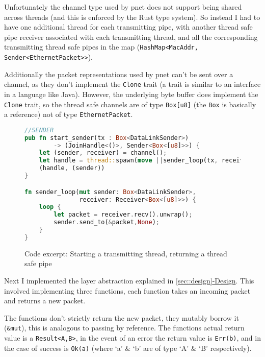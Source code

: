 \documentclass[12pt,a4paper,twoside,openright]{report}
\begin{document}
Unfortunately the channel type used by pnet does not support being shared across threads (and this is enforced by the Rust type system).  So instead I had to have one additional thread for each transmitting pipe, with another thread safe pipe receiver associated with each transmitting thread, and all the corresponding transmitting thread safe pipes in the map (\verb!HashMap<MacAddr, Sender<EthernetPacket>>!).

Additionally the packet representations used by pnet can't be sent over a channel, as they don't implement the \verb!Clone! trait (a trait is similar to an interface in a language like Java).  However, the underlying byte buffer does implement the \verb!Clone! trait, so the thread safe channels are of type \verb!Box[u8]! (the \verb!Box! is basically a reference) not of type \verb!EthernetPacket!. 

\begin{figure}
\centering
\begin{varwidth}{\linewidth}
\begin{lstlisting}[language=Rust]
//SENDER
pub fn start_sender(tx : Box<DataLinkSender>) 
 		-> (JoinHandle<()>, Sender<Box<[u8]>>) {
    let (sender, receiver) = channel();
    let handle = thread::spawn(move ||sender_loop(tx, receiver));
    (handle, (sender))
}

fn sender_loop(mut sender: Box<DataLinkSender>, 
			   receiver: Receiver<Box<[u8]>>) {
    loop {
        let packet = receiver.recv().unwrap();
        sender.send_to(&packet,None);
    }
}
\end{lstlisting}
\end{varwidth}
\caption{Code excerpt: Starting a transmitting thread, returning a thread safe pipe}
\label{fig::sending}
\end{figure}

\bigskip

Next I implemented the layer abstraction explained in \ref{sec::design}\hyperref[sec::design]{-Design}.  This involved implementing three functions, each function takes an incoming packet and returns a new packet.  

The functions don't strictly return the new packet, they mutably borrow it (\verb!&mut!), this is analogous to passing by reference. The functions actual return value is a \verb!Result<A,B>!, in the event of an error the return value is \verb!Err(b)!, and in the case of success is \verb!Ok(a)! (where `a' \& `b' are of type `A' \& `B' respectively). 
\end{document}
